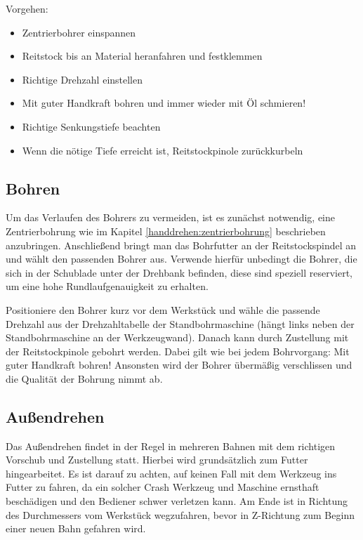 \documentclass{\basedir/fablab-document}
\begin{document}
Vorgehen:
\begin{itemize}
\item Zentrierbohrer einspannen
\item Reitstock bis an Material heranfahren und festklemmen
\item Richtige Drehzahl einstellen
\item Mit guter Handkraft bohren und immer wieder mit Öl schmieren!
\item Richtige Senkungstiefe beachten
\item Wenn die nötige Tiefe erreicht ist, Reitstockpinole zurückkurbeln

\end{itemize}

\subsection{Bohren}

Um das Verlaufen des Bohrers zu vermeiden, ist es zunächst notwendig, eine Zentrierbohrung wie im Kapitel \ref{handdrehen:zentrierbohrung} beschrieben anzubringen.
Anschließend bringt man das Bohrfutter an der Reitstockspindel an und wählt den passenden Bohrer aus.
Verwende hierfür unbedingt die Bohrer, die sich in der Schublade unter der Drehbank befinden, diese sind speziell reserviert, um eine hohe Rundlaufgenauigkeit zu erhalten.

Positioniere den Bohrer kurz vor dem Werkstück und wähle die passende Drehzahl aus der Drehzahltabelle der Standbohrmaschine (hängt links neben der Standbohrmaschine an der Werkzeugwand).
Danach kann durch Zustellung mit der Reitstockpinole gebohrt werden.
Dabei gilt wie bei jedem Bohrvorgang: Mit guter Handkraft bohren!
Ansonsten wird der Bohrer übermäßig verschlissen und die Qualität der Bohrung nimmt ab.

\subsection{Außendrehen} 

Das Außendrehen findet in der Regel in mehreren Bahnen mit dem richtigen Vorschub und Zustellung statt.
Hierbei wird grundsätzlich zum Futter hingearbeitet.
Es ist darauf zu achten, auf keinen Fall mit dem Werkzeug ins Futter zu fahren, da ein solcher Crash Werkzeug und Maschine ernsthaft beschädigen und den Bediener schwer verletzen kann.
Am Ende ist in Richtung des Durchmessers vom Werkstück wegzufahren, bevor in Z-Richtung zum Beginn einer neuen Bahn gefahren wird.
\end{document}
